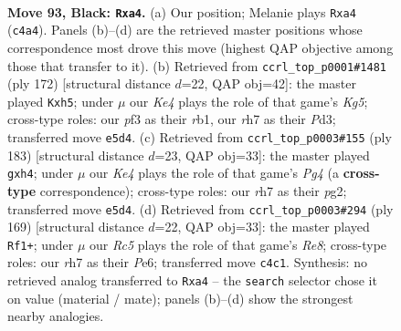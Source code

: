 \documentclass[11pt]{article}
\begin{document}
\clearpage

\begin{figure}[p]\centering
\begin{subfigure}{0.46\textwidth}\centering
\resizebox{\linewidth}{!}{%
\newchessgame
\chessboard[
  setfen={8/7R/1R2pp2/4k3/P1r1P3/5P2/6K1/8 b - - 13 93},
  showmover=false,
  pgfstyle=straightmove, color=movearrow, markmove={c4-a4}
]}
\caption{}
\end{subfigure}\hfill
\begin{subfigure}{0.46\textwidth}\centering
\resizebox{\linewidth}{!}{%
\newchessgame
\chessboard[
  setfen={8/4k3/8/1R4Kp/6pP/3P2P1/1p6/1r6 w - - 2 87},
  showmover=false,
  pgfstyle=straightmove, color=movearrow, markmove={g5-h5}
]}
\caption{}
\end{subfigure}
\\[4pt]
\begin{subfigure}{0.46\textwidth}\centering
\resizebox{\linewidth}{!}{%
\newchessgame
\chessboard[
  setfen={2R5/8/8/6pk/1r3p1P/5P2/6PK/8 b - - 0 92},
  showmover=false,
  pgfstyle=straightmove, color=movearrow, markmove={g5-h4}
]}
\caption{}
\end{subfigure}\hfill
\begin{subfigure}{0.46\textwidth}\centering
\resizebox{\linewidth}{!}{%
\newchessgame
\chessboard[
  setfen={7R/5p2/4pPk1/4P2p/5K2/6P1/8/4r3 b - - 49 85},
  showmover=false,
  pgfstyle=straightmove, color=movearrow, markmove={e1-f1}
]}
\caption{}
\end{subfigure}
\caption{\textbf{Move 93, Black: \texttt{Rxa4}.} (a) Our position; Melanie plays \texttt{Rxa4} (\texttt{c4a4}). Panels (b)--(d) are the retrieved master positions whose correspondence most drove this move (highest QAP objective among those that transfer to it). (b) Retrieved from \texttt{ccrl\_top\_p0001\#1481} (ply 172) [structural distance $d$=22, QAP obj=42]: the master played \texttt{Kxh5}; under $\mu$ our \emph{Ke4} plays the role of that game's \emph{Kg5}; cross-type roles: our \emph{p}f3 as their \emph{r}b1, our \emph{r}h7 as their \emph{P}d3; transferred move \texttt{e5d4}. (c) Retrieved from \texttt{ccrl\_top\_p0003\#155} (ply 183) [structural distance $d$=23, QAP obj=33]: the master played \texttt{gxh4}; under $\mu$ our \emph{Ke4} plays the role of that game's \emph{Pg4} (a \textbf{cross-type} correspondence); cross-type roles: our \emph{r}h7 as their \emph{p}g2; transferred move \texttt{e5d4}. (d) Retrieved from \texttt{ccrl\_top\_p0003\#294} (ply 169) [structural distance $d$=22, QAP obj=33]: the master played \texttt{Rf1+}; under $\mu$ our \emph{Rc5} plays the role of that game's \emph{Re8}; cross-type roles: our \emph{r}h7 as their \emph{P}e6; transferred move \texttt{c4c1}. Synthesis: no retrieved analog transferred to \texttt{Rxa4} -- the \texttt{search} selector chose it on value (material / mate); panels (b)--(d) show the strongest nearby analogies.}
\label{fig:thought-m185}
\end{figure}
\end{document}

